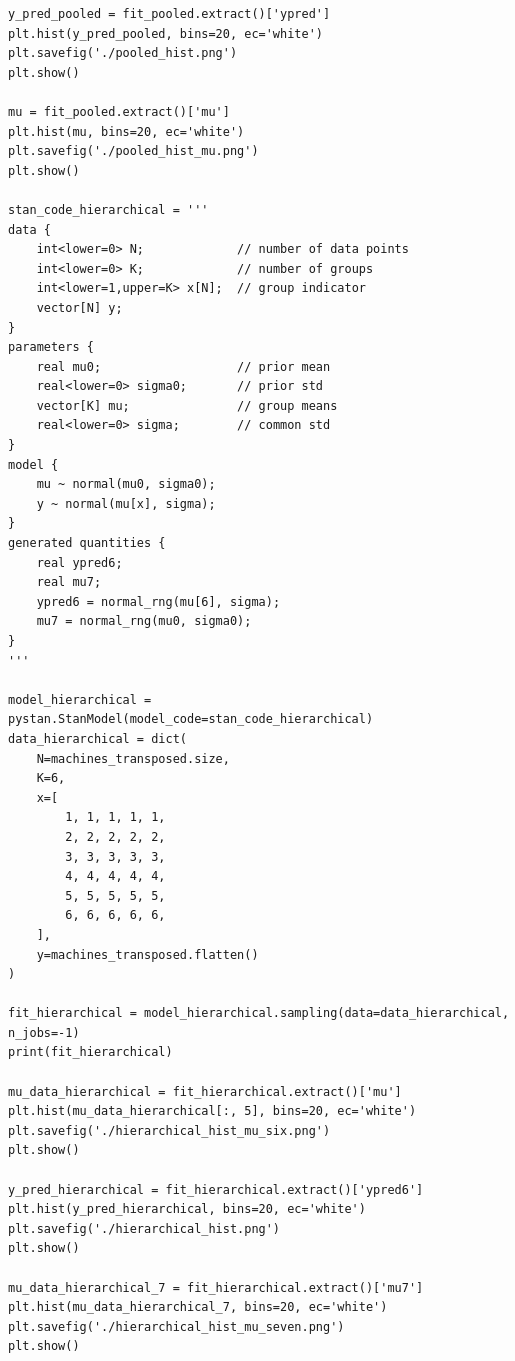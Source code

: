 \documentclass{article}
\begin{document}
\begin{verbatim}
y_pred_pooled = fit_pooled.extract()['ypred']
plt.hist(y_pred_pooled, bins=20, ec='white')
plt.savefig('./pooled_hist.png')
plt.show()

mu = fit_pooled.extract()['mu']
plt.hist(mu, bins=20, ec='white')
plt.savefig('./pooled_hist_mu.png')
plt.show()

stan_code_hierarchical = '''
data {
    int<lower=0> N;             // number of data points
    int<lower=0> K;             // number of groups
    int<lower=1,upper=K> x[N];  // group indicator
    vector[N] y;
}
parameters {
    real mu0;                   // prior mean
    real<lower=0> sigma0;       // prior std
    vector[K] mu;               // group means
    real<lower=0> sigma;        // common std
}
model {
    mu ~ normal(mu0, sigma0);
    y ~ normal(mu[x], sigma);
}
generated quantities {
    real ypred6;
    real mu7;
    ypred6 = normal_rng(mu[6], sigma);
    mu7 = normal_rng(mu0, sigma0);
}
'''

model_hierarchical = pystan.StanModel(model_code=stan_code_hierarchical)
data_hierarchical = dict(
    N=machines_transposed.size,
    K=6,
    x=[
        1, 1, 1, 1, 1,
        2, 2, 2, 2, 2,
        3, 3, 3, 3, 3,
        4, 4, 4, 4, 4,
        5, 5, 5, 5, 5,
        6, 6, 6, 6, 6,
    ],
    y=machines_transposed.flatten()
)

fit_hierarchical = model_hierarchical.sampling(data=data_hierarchical, n_jobs=-1)
print(fit_hierarchical)

mu_data_hierarchical = fit_hierarchical.extract()['mu']
plt.hist(mu_data_hierarchical[:, 5], bins=20, ec='white')
plt.savefig('./hierarchical_hist_mu_six.png')
plt.show()

y_pred_hierarchical = fit_hierarchical.extract()['ypred6']
plt.hist(y_pred_hierarchical, bins=20, ec='white')
plt.savefig('./hierarchical_hist.png')
plt.show()

mu_data_hierarchical_7 = fit_hierarchical.extract()['mu7']
plt.hist(mu_data_hierarchical_7, bins=20, ec='white')
plt.savefig('./hierarchical_hist_mu_seven.png')
plt.show()

\end{verbatim}
\end{document}
